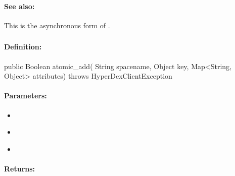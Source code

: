 \paragraph{See also:}  This is the asynchronous form of .

\pagebreak
\subsubsection{}
\label{api:java:atomic_add}


\paragraph{Definition:}
\begin{javacode}
public Boolean atomic_add(
        String spacename,
        Object key,
        Map<String, Object> attributes) throws HyperDexClientException
\end{javacode}

\paragraph{Parameters:}
\begin{itemize}[noitemsep]
\item {}\\

\item {}\\

\item {}\\

\end{itemize}

\paragraph{Returns:}


\pagebreak
\subsubsection{}
\label{api:java:async_atomic_add}


